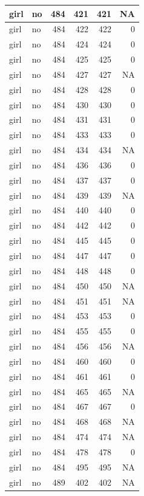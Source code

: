 \documentclass[man]{apa6}
\begin{document}
\begin{tabular}{l|l|r|r|r|r}
\hline
girl & no & 484 & 421 & 421 & NA\\
\hline
girl & no & 484 & 422 & 422 & 0\\
\hline
girl & no & 484 & 424 & 424 & 0\\
\hline
girl & no & 484 & 425 & 425 & 0\\
\hline
girl & no & 484 & 427 & 427 & NA\\
\hline
girl & no & 484 & 428 & 428 & 0\\
\hline
girl & no & 484 & 430 & 430 & 0\\
\hline
girl & no & 484 & 431 & 431 & 0\\
\hline
girl & no & 484 & 433 & 433 & 0\\
\hline
girl & no & 484 & 434 & 434 & NA\\
\hline
girl & no & 484 & 436 & 436 & 0\\
\hline
girl & no & 484 & 437 & 437 & 0\\
\hline
girl & no & 484 & 439 & 439 & NA\\
\hline
girl & no & 484 & 440 & 440 & 0\\
\hline
girl & no & 484 & 442 & 442 & 0\\
\hline
girl & no & 484 & 445 & 445 & 0\\
\hline
girl & no & 484 & 447 & 447 & 0\\
\hline
girl & no & 484 & 448 & 448 & 0\\
\hline
girl & no & 484 & 450 & 450 & NA\\
\hline
girl & no & 484 & 451 & 451 & NA\\
\hline
girl & no & 484 & 453 & 453 & 0\\
\hline
girl & no & 484 & 455 & 455 & 0\\
\hline
girl & no & 484 & 456 & 456 & NA\\
\hline
girl & no & 484 & 460 & 460 & 0\\
\hline
girl & no & 484 & 461 & 461 & 0\\
\hline
girl & no & 484 & 465 & 465 & NA\\
\hline
girl & no & 484 & 467 & 467 & 0\\
\hline
girl & no & 484 & 468 & 468 & NA\\
\hline
girl & no & 484 & 474 & 474 & NA\\
\hline
girl & no & 484 & 478 & 478 & 0\\
\hline
girl & no & 484 & 495 & 495 & NA\\
\hline
girl & no & 489 & 402 & 402 & NA\\

\end{tabular}
\end{document}
